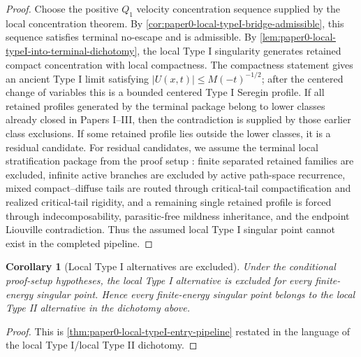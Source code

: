 \documentclass[11pt]{amsart}
\theoremstyle{plain}
\newtheorem{corollary}[corollary]{Corollary}
\theoremstyle{definition}
\theoremstyle{remark}
\begin{document}
\begin{proof}
Choose the positive \(Q_1\) velocity concentration sequence supplied by the
local concentration theorem.  By
\cref{cor:paper0-local-typeI-bridge-admissible}, this sequence satisfies
terminal no-escape and is admissible.
By \cref{lem:paper0-local-typeI-into-terminal-dichotomy}, the local Type I
singularity generates retained compact concentration with local compactness.
The compactness statement gives an ancient Type I limit satisfying
\(|U(x,t)|\le M(-t)^{-1/2}\); after the centered change of variables this is a
bounded centered Type I Seregin profile.  If all retained profiles generated by
the terminal package belong to lower classes already closed in Papers I--III,
then the contradiction is supplied by those earlier class exclusions.  If some
retained profile lies outside the lower classes, it is a residual candidate.
For residual candidates, we assume the terminal local stratification package
from the proof setup \cite{ProofSetupTypeI}: finite separated retained
families are excluded, infinite active branches are excluded by active
path-space recurrence, mixed compact--diffuse tails are routed through
critical-tail compactification and realized critical-tail rigidity, and a
remaining single retained profile is forced through indecomposability,
parasitic-free mildness inheritance, and the endpoint Liouville contradiction.
Thus the assumed local Type I singular point cannot exist in the completed
pipeline.
\end{proof}

\begin{corollary}[Local Type I alternatives are excluded]
\label{cor:paper0-local-typeII-after-bridge}
Under the conditional proof-setup hypotheses, the local Type I alternative is
excluded for every finite-energy singular point.  Hence every finite-energy
singular point belongs to the local Type II alternative in the dichotomy above.
\end{corollary}

\begin{proof}
This is \cref{thm:paper0-local-typeI-entry-pipeline} restated in the language
of the local Type I/local Type II dichotomy.
\end{proof}
\end{document}
